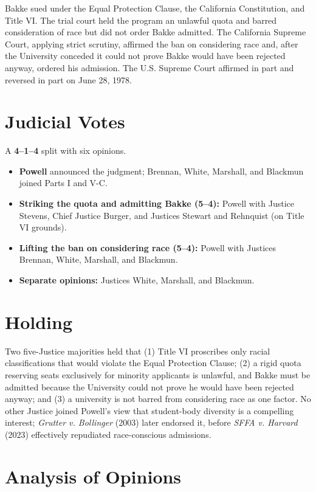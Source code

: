 \documentclass[12pt]{article}
\begin{document}
Bakke sued under the Equal Protection Clause, the California Constitution, and Title VI. The trial court held the program an unlawful quota and barred consideration of race but did not order Bakke admitted. The California Supreme Court, applying strict scrutiny, affirmed the ban on considering race and, after the University conceded it could not prove Bakke would have been rejected anyway, ordered his admission. The U.S. Supreme Court affirmed in part and reversed in part on June 28, 1978.

\section{Judicial Votes}

A \textbf{4--1--4} split with six opinions.
\begin{itemize}
\item \textbf{Powell} announced the judgment; Brennan, White, Marshall, and Blackmun joined Parts I and V-C.
\item \textbf{Striking the quota and admitting Bakke (5--4):} Powell with Justice Stevens, Chief Justice Burger, and Justices Stewart and Rehnquist (on Title VI grounds).
\item \textbf{Lifting the ban on considering race (5--4):} Powell with Justices Brennan, White, Marshall, and Blackmun.
\item \textbf{Separate opinions:} Justices White, Marshall, and Blackmun.
\end{itemize}

\section{Holding}

Two five-Justice majorities held that (1) Title VI proscribes only racial classifications that would violate the Equal Protection Clause; (2) a rigid quota reserving seats exclusively for minority applicants is unlawful, and Bakke must be admitted because the University could not prove he would have been rejected anyway; and (3) a university is not barred from considering race as one factor. No other Justice joined Powell's view that student-body diversity is a compelling interest; \textit{Grutter v. Bollinger} (2003) later endorsed it, before \textit{SFFA v. Harvard} (2023) effectively repudiated race-conscious admissions.

\section{Analysis of Opinions}
\end{document}
